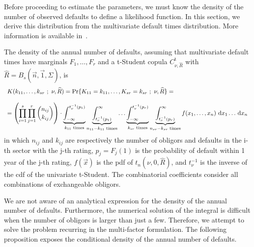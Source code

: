\documentclass[11pt,fleqn]{book} %
\begin{document}
Before proceeding to estimate the parameters, we must know the density
of the number of observed defaults to define a likelihood function. In 
this section, we derive this distribution from the multivariate default 
times distribution. More information is available 
in~\cite{gordy:2002,roncalli:2004}.

\begin{proposition}
	The density of the annual number of defaults, assuming that multivariate 
	default times have marginals $F_1,\dots,F_r$ and a t-Student copula 
	$C_{\nu,\widehat{R}}^{\text{t}}$ with 
	$\widehat{R} = B_s(\vec{n},\vec{1},\Sigma)$, is
	\begin{displaymath}
		\begin{array}{l}
			K(k_{11},\dots,k_{sr}\ ;\ \nu, \widehat{R}) = 
			\Pr\{K_{11}=k_{11},\dots,K_{sr}=k_{sr}\ ;\ \nu, \widehat{R}\} = \\
			\\
			= \left( \displaystyle \prod_{i=1}^s \prod_{j=1}^r \binom{n_{ij}}{k_{ij}} \right) \cdot
			\displaystyle
			\underbrace{\int_{-\infty}^{t_{\nu}^{-1}(p_1)}}_{k_{11} \text{ times}}
			\underbrace{\int_{t_{\nu}^{-1}(p_1)}^{\infty}}_{n_{11}-k_{11} \text{ times}}
			\dots
			\underbrace{\int_{-\infty}^{t_{\nu}^{-1}(p_r)}}_{k_{sr} \text{ times}}
			\underbrace{\int_{t_{\nu}^{-1}(p_r)}^{\infty}}_{n_{sr}-k_{sr} \text{ times}}
			f(x_1,\dots,x_n) \mathop{\,\mathrm{{}d}}\mathopen{} x_1 \dots \mathop{\,\mathrm{{}d}}\mathopen{} x_n
		\end{array}
	\end{displaymath}
	in which $n_{ij}$ and $k_{ij}$ are respectively the number of obligors and 
	defaults in the i-th sector with the j-th rating, $p_j = F_j(1)$ is the 
	probability of default within 1 year of the j-th rating, $f(\vec{x})$ 
	is the pdf of $t_n(\nu,0,\widehat{R})$, and $t_{\nu}^{-1}$ is the inverse of 
	the cdf of the univariate t-Student. The combinatorial coefficients 
	consider all combinations of exchangeable obligors.
\end{proposition}

We are not aware of an analytical expression for the density of the annual 
number of defaults. Furthermore, the numerical solution of the integral is 
difficult when the number of obligors is larger than just a few. Therefore,
we attempt to solve the problem recurring in the multi-factor formulation. 
The following proposition exposes the conditional density of the annual 
number of defaults.
\end{document}
